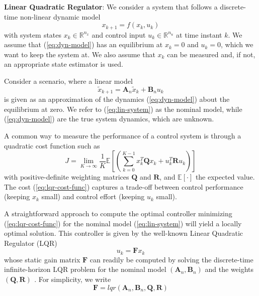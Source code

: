 \textbf{Linear Quadratic Regulator}: We consider\textcolor{white}{"}a system that follows a discrete-time non-linear dynamic model\textcolor{white}{"}
\begin{equation}
	\label{eq:dyn-model}
	x_{k+1} = f(x_k, u_k)
\end{equation}
with system\textcolor{white}{"}states $x_k \in \mathbb{R}^{n_x}$ and control input $u_k \in \mathbb{R}^{n_u}$ at time instant $k$. We assume that (\ref{eq:dyn-model}) has an equilibrium at $x_k=0$ and $u_k=0$, which we want to keep the system at. We also assume that $x_k$ can be measured and, if not, an appropriate state estimator is used.\textcolor{white}{"}

Consider a scenario, where a linear model
\begin{equation}
\label{eq:lin-system}
\tilde{x}_{k+1} = \boldsymbol{A}_n \tilde{x}_k + \boldsymbol{B}_n u_k
\end{equation}
is given\textcolor{white}{"}as an approximation of the dynamics (\ref{eq:dyn-model}) about the equilibrium at zero. We refer to (\ref{eq:lin-system}) as the nominal model, while (\ref{eq:dyn-model}) are the true system dynamics, which are unknown.\textcolor{white}{"}

A common way\textcolor{white}{"}to measure the performance of a control system is through a quadratic cost function such as\textcolor{white}{"}
\begin{equation}
\label{eq:lqr-cost-func}
J=\lim_{K \rightarrow \infty}\frac{1}{K}\mathbb{E}\left[\left(\sum_{k=0}^{K-1}x_k^{T}\boldsymbol{Q}x_k + u_k^{T}\boldsymbol{R}u_k\right)\right]
\end{equation}
with positive-definite weighting\textcolor{white}{"}matrices $\boldsymbol{Q}$ and $\boldsymbol{R}$, and $\mathbb{E}[\cdot]$ the expected value. The cost (\ref{eq:lqr-cost-func}) captures a trade-off between control performance (keeping $x_k$ small) and control effort (keeping $u_k$ small).\textcolor{white}{"}

A straightforward approach to compute the optimal controller minimizing (\ref{eq:lqr-cost-func}) for the nominal model (\ref{eq:lin-system}) will yield a locally optimal solution. This controller is given by the well-known Linear Quadratic Regulator (LQR) 
\begin{equation}
u_k = \boldsymbol{F}x_k
\end{equation}
whose static\textcolor{white}{"}gain matrix $\boldsymbol{F}$ can readily be computed by solving the discrete-time infinite-horizon LQR problem for the nominal model $(\boldsymbol{A}_n, \boldsymbol{B}_n)$ and the weights $(\boldsymbol{Q}, \boldsymbol{R})$\textcolor{white}{"}. For simplicity, we write
\begin{equation}
\label{eq:lqr}
\boldsymbol{F} = lqr(\boldsymbol{A}_n, \boldsymbol{B}_n, \boldsymbol{Q}, \boldsymbol{R})
\end{equation}

